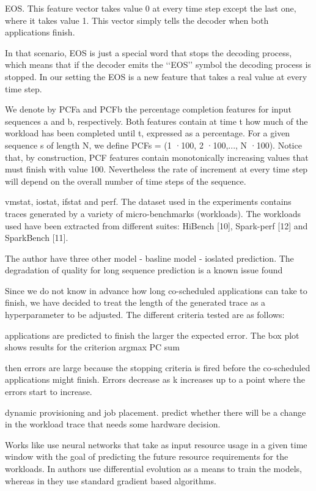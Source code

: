 \documentclass[UTF8]{article}
\begin{document}
EOS. This feature vector takes value 0 at every time step except the last one, where it takes value 1. This vector simply tells the decoder when both applications finish.

In that scenario, EOS is just a special word that stops the decoding process, which means that if the decoder emits the ‘‘EOS’’ symbol the decoding process is stopped. In our setting the EOS is a new feature that takes a real value at every time step.

We denote by PCFa and PCFb the percentage completion features for input sequences a and b, respectively. Both features contain at time t how much of the workload has been completed until t, expressed as a percentage. For a given sequence s of length N, we define PCFs = (1 ·100, 2 ·100,..., N ·100). Notice that, by construction, PCF features contain monotonically increasing values that must finish with value 100. Nevertheless the rate of increment at every time step will depend on the overall number of time steps of the sequence.

vmstat, iostat, ifstat and perf. The dataset used in the experiments contains traces generated by a variety of micro-benchmarks (workloads). The workloads used have been extracted from different suites: HiBench [10], Spark-perf [12] and SparkBench [11]. 

The author have three other model - basline model - ioslated prediction. The degradation of quality for long sequence prediction is a known issue found

Since we do not know in advance how long co-scheduled applications can take to finish, we have decided to treat the length of the generated trace as a hyperparameter to be adjusted. The different criteria tested are as follows:

applications are predicted to finish the larger the expected error. The box plot shows results for the criterion argmax PC sum

then errors are large because the stopping criteria is fired before the co-scheduled applications might finish. Errors decrease as k increases up to a point where the errors start to increase.

dynamic provisioning and job placement. predict whether there will be a change in the workload trace that needs some hardware decision. 

Works like \cite{islam2012empirical, kumar2018workload} use neural networks that take as input resource usage in a given time window with the goal of predicting the future resource requirements for the workloads. In authors use differential evolution as a means to train the models, whereas in they use standard gradient based algorithms.
\end{document}
